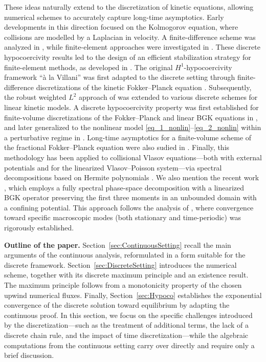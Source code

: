 \documentclass[reqno]{amsart}
\numberwithin{equation}{section}
\begin{document}
These ideas naturally extend to the discretization of kinetic equations, allowing numerical schemes to accurately capture long-time asymptotics. Early developments in this direction focused on the Kolmogorov equation, where collisions are modelled by a Laplacian in velocity. A finite-difference scheme was analyzed in \cite{PorrettaZuazua2017}, while finite-element approaches were investigated in \cite{Georgoulis2021, ZhaonanGeorgoulisHerbert2025pp}. These discrete hypocoercivity results led to the design of an efficient stabilization strategy for finite-element methods, as developed in \cite{DongEmmanuilGeorgoulisHerbert2025}. The original $H^1$-hypocoercivity framework “à la Villani” \cite{VillaniHypo2009} was first adapted to the discrete setting through finite-difference discretizations of the kinetic Fokker–Planck equation \cite{DujardinHerauLaffitte2018}. Subsequently, the robust weighted $L^2$ approach of \cite{DolbeaultMouhotSchmeiser2015} was extended to various discrete schemes for linear kinetic models. A discrete hypocoercivity property was first established for finite-volume discretizations of the Fokker–Planck and linear BGK equations in \cite{BessemoulinHerdaRey2020}, and later generalized to the nonlinear model \eqref{eq_1_nonlin}–\eqref{eq_2_nonlin} within a perturbative regime in \cite{BCLR2025}. Long-time asymptotics for a finite-volume scheme of the fractional Fokker–Planck equation were also sudied in \cite{AyiHerdaHivertTristani2023}. Finally, this methodology has been applied to collisional Vlasov equations—both with external potentials and for the linearized Vlasov–Poisson system—via spectral decompositions based on Hermite polynomials \cite{BlausteinFilbet2024_1, BlausteinFilbet2024_2}. We also mention the recent work \cite{Grosse2025}, which employs a fully spectral phase-space decomposition with a linearized BGK operator preserving the first three moments in an unbounded domain with a confining potential. This approach follows the analysis of \cite{CarrapatosoDolbeaultHerauMischlerMouhotSchmeiser2021}, where convergence toward specific macroscopic modes (both stationary and time-periodic) was rigorously established.

\medskip
\textbf{Outline of the paper.}
Section~\ref{sec:ContinuousSetting} recall the main arguments of the continuous analysis, reformulated in a form suitable for the discrete framework. Section~\ref{sec:DiscreteSetting} introduces the numerical scheme, together with its discrete maximum principle and an existence result. The maximum principle follows from a monotonicity property of the chosen upwind numerical fluxes. Finally, Section~\ref{sec:Hypoco} establishes the exponential convergence of the discrete solution toward equilibrium by adapting the continuous proof. In this section, we focus on the specific challenges introduced by the discretization---such as the treatment of additional terms, the lack of a discrete chain rule, and the impact of time discretization---while the algebraic computations from the continuous setting carry over directly and require only a brief discussion.
\end{document}
